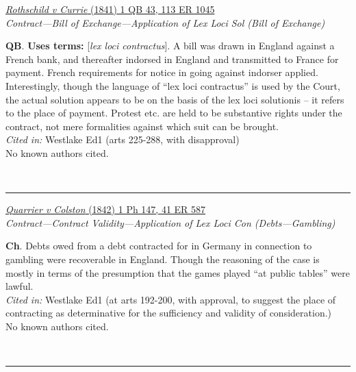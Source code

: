 \documentclass[twoside]{article}
\begin{document}
        \begin{small}
        \begin{center}
        \href{https://heinonline.org/HOL/P?h=hein.engrep/engrf0113&i=1049}{\textit{Rothschild v Currie} (1841) 1 QB 43, 113 ER 1045} \label{92} \\ 
\textit{Contract---Bill of Exchange---Application of Lex Loci Sol (Bill of Exchange)}\\
        \end{center}
        \textbf{QB}.  \textbf{Uses terms: }[\textit{lex loci contractus}]. A bill was drawn in England against a French bank, and thereafter indorsed in England and transmitted to France for payment. French requirements for notice in going against indorser applied. Interestingly, though the language of “lex loci contractus” is used by the Court, the actual solution appears to be on the basis of the lex loci solutionis – it refers to the place of payment. Protest etc. are held to be substantive rights under the contract, not mere formalities against which suit can be brought.\\\textit{Cited in: }Westlake Ed1 (arts 225-288, with disapproval)\\No known authors cited.
        \end{small}\\
        \rule{\textwidth}{0.5pt}
        

        \begin{small}
        \begin{center}
        \href{https://heinonline.org/HOL/Phttps://heinonline.org/HOL/Page?handle=hein.engrep/engrc0041&id=595?h=hein.engrep/engrc0041&i=595}{\textit{Quarrier v Colston} (1842) 1 Ph 147, 41 ER 587} \label{88} \\ 
\textit{Contract---Contract Validity---Application of Lex Loci Con (Debts---Gambling)}\\
        \end{center}
        \textbf{Ch}. Debts owed from a debt contracted for in Germany in connection to gambling were recoverable in England. Though the reasoning of the case is mostly in terms of the presumption that the games played “at public tables” were lawful.\\\textit{Cited in: }Westlake Ed1 (at arts 192-200, with approval, to suggest the place of contracting as determinative for the sufficiency and validity of consideration.)\\No known authors cited.
        \end{small}\\
        \rule{\textwidth}{0.5pt}
        
\end{document}
